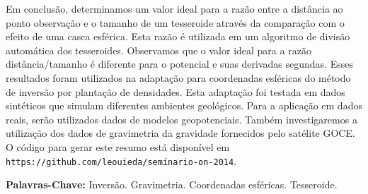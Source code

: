 \documentclass[12pt]{letter}
\begin{document}
Em conclusão,
determinamos um valor ideal
para a razão entre a distância ao ponto observação
e o tamanho de um tesseroide
através da comparação
com o efeito de uma casca esférica.
Esta razão é utilizada
em um algoritmo de divisão automática dos tesseroides.
Observamos que o valor ideal
para a razão distância/tamanho
é diferente para o potencial
e suas derivadas segundas.
Esses resultados foram utilizados
na adaptação para coordenadas esféricas
do método de inversão por plantação de densidades.
Esta adaptação foi testada
em dados sintéticos
que simulam diferentes ambientes geológicos.
Para a aplicação em dados reais,
serão utilizados dados de modelos geopotenciais.
Também investigaremos
a utilização dos dados de gravimetria da gravidade
fornecidos pelo satélite GOCE.
O código para gerar este resumo
está disponível em \texttt{https://github.com/leouieda/seminario-on-2014}.


\begin{flushleft}
\vspace{10 mm}
\textbf{Palavras-Chave:}
Inversão. Gravimetria. Coordenadas esféricas. Tesseroide.
\end{flushleft}
\end{document}
